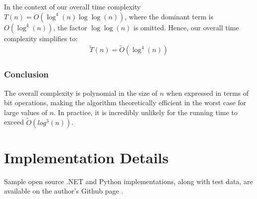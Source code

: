 \documentclass{article}
\theoremstyle{plain}
\theoremstyle{definition}
\begin{document}
In the context of our overall time complexity $T(n) = O(\log^4(n) \log\log(n))$, where the dominant term is \(O(\log^4(n))\), the factor \(\log\log(n)\) is omitted. Hence, our overall time complexity simplifies to:
\begin{align}
    \tilde{T}(n) = \tilde{O}(\log^4(n))
\end{align}

\subsubsection{Conclusion}
The overall complexity is polynomial in the size of \( n \) when expressed in terms of bit operations, making the algorithm theoretically efficient in the worst case for large values of $n$. In practice, it is incredibly unlikely for the running time to exceed $\tilde{O}(log^3(n))$.

\section{Implementation Details}
Sample open source .NET and Python implementations, along with test data, are available on the author's Github page \cite{githubrepo}.

\begingroup
\raggedright


\endgroup
\end{document}
